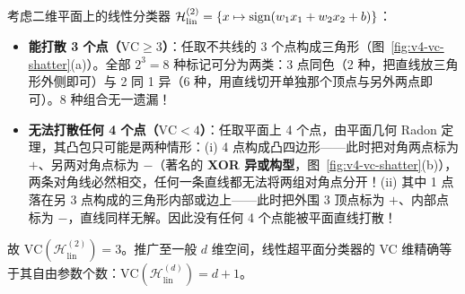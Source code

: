 \begin{example}[二维平面线性分类器的 VC 维 $= 3$]\label{ex:v4-ch3-vc2d}
考虑二维平面上的线性分类器 $\mathcal{H}_{\mathrm{lin}}^{(2)} = \{x \mapsto \operatorname{sign}(w_1 x_1 + w_2 x_2 + b)\}$：
\begin{itemize}
  \item \textbf{能打散 3 个点（$\mathrm{VC} \ge 3$）}：任取不共线的 3 个点构成三角形（图~\ref{fig:v4-vc-shatter}(a)）。全部 $2^3 = 8$ 种标记可分为两类：3 点同色（2 种，把直线放三角形外侧即可）与 2 同 1 异（6 种，用直线切开单独那个顶点与另外两点即可）。8 种组合无一遗漏！
  \item \textbf{无法打散任何 4 个点（$\mathrm{VC} < 4$）}：任取平面上 4 个点，由平面几何 Radon 定理，其凸包只可能是两种情形：(i) 4 点构成凸四边形——此时把对角两点标为 $+$、另两对角点标为 $-$（著名的 \textbf{XOR 异或构型}，图~\ref{fig:v4-vc-shatter}(b)），两条对角线必然相交，任何一条直线都无法将两组对角点分开！(ii) 其中 1 点落在另 3 点构成的三角形内部或边上——此时把外围 3 顶点标为 $+$、内部点标为 $-$，直线同样无解。因此没有任何 4 个点能被平面直线打散！
\end{itemize}
故 $\mathrm{VC}(\mathcal{H}_{\mathrm{lin}}^{(2)}) = 3$。推广至一般 $d$ 维空间，线性超平面分类器的 VC 维精确等于其自由参数个数：$\mathrm{VC}(\mathcal{H}_{\mathrm{lin}}^{(d)}) = d + 1$。
\end{example}

